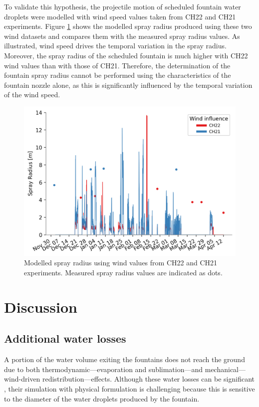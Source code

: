 \documentclass[tc, manuscript]{copernicus}
\begin{document}
To validate this hypothesis, the projectile motion of scheduled fountain water droplets were modelled with wind
speed values taken from CH22 and CH21 experiments. Figure \ref{fig:wind} shows the modelled spray radius
produced using these two wind datasets and compares them with the measured spray radius values. As illustrated,
wind speed drives the temporal variation in the spray radius. Moreover, the spray radius of the scheduled
fountain is much higher with CH22 wind values than with those of CH21. Therefore, the determination of the
fountain spray radius cannot be performed using the characteristics of the fountain nozzle alone, as this is
significantly influenced by the temporal variation of the wind speed.

\begin{figure}[htb]
\includegraphics[width=12 cm]{Figures/radf.png}
\caption{Modelled spray radius using wind values from CH22 and CH21 experiments. Measured spray radius values are
indicated as dots.}
\label{fig:wind}
\end{figure}

\section{Discussion}

\subsection{Additional water losses}

A portion of the water volume exiting the fountains does not reach the ground due to both
thermodynamic---evaporation and sublimation---and mechanical---wind-driven redistribution---effects. Although
these water losses can be significant \citep{hanzerSimulationSnowManagement2020}, their simulation with physical
formulation is challenging because this is sensitive to the diameter of the water droplets produced by the
fountain.
\end{document}
